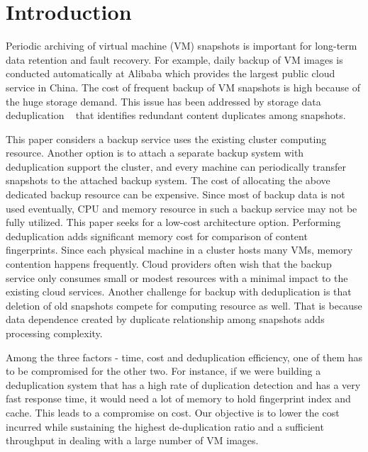 \section{Introduction}



Periodic  archiving of virtual machine (VM) snapshots is important 
for long-term data  retention and fault recovery. 
For example, daily backup of VM images  is conducted automatically 
at Alibaba which provides the largest public cloud service in China.
The cost of frequent backup of VM snapshots is  high because of the huge storage demand.
This issue has been addressed by   storage data deduplication ~\cite{venti02,bottleneck08} that
identifies redundant content duplicates among snapshots.  

This paper considers a backup service uses the existing cluster computing resource.
Another option is to attach  a separate backup system with deduplication
support the cluster, and  every machine can periodically transfer snapshots to
the attached backup system.
The cost of allocating the above dedicated backup  resource can be expensive.
Since most of backup data is not used eventually, CPU and memory resource in such a backup service may
not be fully utilized. This paper seeks for a low-cost architecture option.
Performing
deduplication adds significant  memory cost for comparison of content fingerprints. 
Since each physical machine in a cluster  hosts many VMs, memory contention happens frequently. 
Cloud providers often wish that the backup service only consumes  small or modest resources 
with a minimal impact to the existing cloud services.  Another challenge for backup with deduplication is 
that deletion of old snapshots compete for computing resource as well. That is because data dependence created 
by duplicate relationship among snapshots  adds processing complexity.

Among the three factors - time, cost and deduplication efficiency, one of them has to be compromised for the other two. For instance, if we were building a deduplication system that has a high rate of duplication detection and has a very fast response time, 
it would need a lot of memory to hold fingerprint index and cache.  This leads to a compromise on cost. 
Our objective is to lower the cost incurred while sustaining the highest de-duplication ratio
and  a sufficient throughput in dealing with a large number of VM images. 

